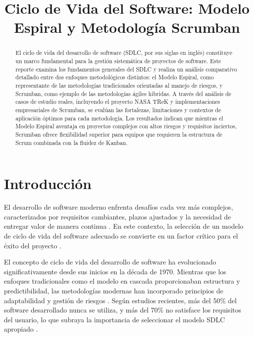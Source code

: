 \documentclass[conference]{IEEEtran}
\begin{document}
\title{Ciclo de Vida del Software: Modelo Espiral y Metodología Scrumban}

\author{
}

\pagestyle{plain}

\maketitle

\begin{abstract}
El ciclo de vida del desarrollo de software (SDLC, por sus siglas en inglés) constituye un marco fundamental para la gestión sistemática de proyectos de software. Este reporte examina los fundamentos generales del SDLC y realiza un análisis comparativo detallado entre dos enfoques metodológicos distintos: el Modelo Espiral, como representante de las metodologías tradicionales orientadas al manejo de riesgos, y Scrumban, como ejemplo de las metodologías ágiles híbridas. A través del análisis de casos de estudio reales, incluyendo el proyecto NASA TReK y implementaciones empresariales de Scrumban, se evalúan las fortalezas, limitaciones y contextos de aplicación óptimos para cada metodología. Los resultados indican que mientras el Modelo Espiral aventaja en proyectos complejos con altos riesgos y requisitos inciertos, Scrumban ofrece flexibilidad superior para equipos que requieren la estructura de Scrum combinada con la fluidez de Kanban.
\end{abstract}

\section{Introducción}

El desarrollo de software moderno enfrenta desafíos cada vez más complejos, caracterizados por requisitos cambiantes, plazos ajustados y la necesidad de entregar valor de manera continua \cite{dhiman2024reassessment}. En este contexto, la selección de un modelo de ciclo de vida del software adecuado se convierte en un factor crítico para el éxito del proyecto \cite{comparative_study_2020}.

El concepto de ciclo de vida del desarrollo de software ha evolucionado significativamente desde sus inicios en la década de 1970. Mientras que los enfoques tradicionales como el modelo en cascada proporcionaban estructura y predictibilidad, las metodologías modernas han incorporado principios de adaptabilidad y gestión de riesgos \cite{shylesh2017study}. Según estudios recientes, más del 50\% del software desarrollado nunca se utiliza, y más del 70\% no satisface los requisitos del usuario, lo que subraya la importancia de seleccionar el modelo SDLC apropiado \cite{ieee_comparative_2021}.
\end{document}
